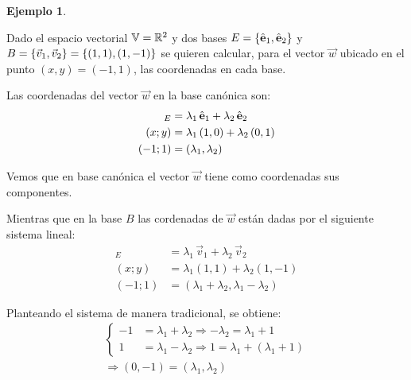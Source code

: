 \documentclass[a5paper,12pt,twoside]{book}
\newtheorem{example}{{Ejemplo}}[chapter]
\begin{document}
\begin{mdframed}[style=MyFrame2]
    \begin{example}
    \end{example}
    Dado el espacio vectorial $\mathbb{V}=\mathbb{R}^2$ y dos bases $E={ \left\{ {\hat{\textbf{e}}_1,\hat{\textbf{e}}_2} \right\} }$ y $B={ \left\{ {\Vec{v}_1,\Vec{v}_2} \right\} }={ \left\{ {(1,1),(1,-1)} \right\} }$ se quieren calcular, para el vector $\Vec{w}$ ubicado en el punto $(x,y)=(-1,1)$, las coordenadas en cada base.
    
    \begin{center}
        \def\svgwidth{0.6\linewidth}
        
    \end{center}
    
    Las coordenadas del vector $\Vec{w}$ en la base canónica son:
    \begin{align*}
        [\Vec{w}]_E &= \lambda_1 \, \eVer_1 + \lambda_2 \, \eVer_2
        \\
        (x;y) &= \lambda_1 \left(1,0\right) + \lambda_2 \left(0,1\right)
        \\
        (-1;1) &= (\lambda_1,\lambda_2)
    \end{align*}
    
    Vemos que en base canónica el vector $\Vec{w}$ tiene como coordenadas sus componentes.
    
    Mientras que en la base $B$ las cordenadas de $\Vec{w}$ están dadas por el siguiente sistema lineal:
    \begin{align*}
        [\Vec{w}]_E &= \lambda_1 \, \Vec{v}_1 + \lambda_2 \, \Vec{v}_2
        \\
        (x;y) &= \lambda_1 \left(1,1\right) + \lambda_2 \left(1,-1\right)
        \\
        (-1;1) &= (\lambda_1+\lambda_2,\lambda_1-\lambda_2)
    \end{align*}
    
    Planteando el sistema de manera tradicional, se obtiene:
    \begin{gather*}
        \left\{
        \begin{aligned}
            -1 &= \lambda_1+\lambda_2 \Rightarrow -\lambda_2=\lambda_1+1 
            \\
            1 &= \lambda_1-\lambda_2 \Rightarrow 1=\lambda_1+(\lambda_1+1)
        \end{aligned}
        \right.
        \\
        \Rightarrow (0,-1) = (\lambda_1,\lambda_2)
    \end{gather*}
    

\end{mdframed}
\end{document}
